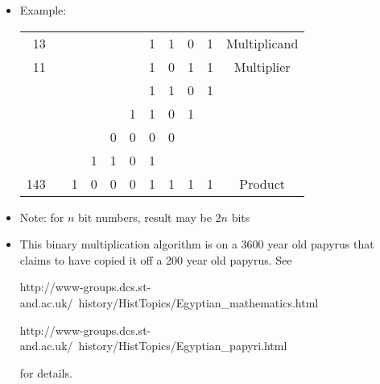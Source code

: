 \setlength{\columnseprule}{1pt}
\def\columnseprulecolor{\color{blue}}

\begin{frame}[fragile]
\begin{itemize}
	\item Example:
	\begin{center}
	\begin{tabular}{rcccccccccc}
	13 & & &  &&& 1 & 1 & 0 & 1 & Multiplicand\\
	11 & & &  &&& 1 & 0 & 1 & 1 & Multiplier\\\cline{1-1}\cline{7-10}
	  & & &  &&& 1 & 1 & 0& 1\\
	  & & &  &&1& 1 & 0 & 1& \\
	  & & &  &0& 0 & 0 & 0& &\\
	  & & &  1&1& 0 & 1&  & &\\
	\cline{1-1}\cline{3-10}
	143 & & 1& 0 &0 & 0 & 1 & 1 & 1& 1 & Product\\
	\end{tabular}
	\end{center}




	\item Note: for $n$ bit numbers, result may be $2n$ bits
\end{itemize}

\BNotes\ifnum{}
\begin{itemize}
\item This binary multiplication algorithm is on a 3600 year old papyrus
	that claims to have copied it off a 200 year old papyrus.  See

	http://www-groups.dcs.st-and.ac.uk/~history/HistTopics/Egyptian\_mathematics.html

http://www-groups.dcs.st-and.ac.uk/~history/HistTopics/Egyptian\_papyri.html

for details.
\end{itemize}
\fi\ENotes
\end{frame}

